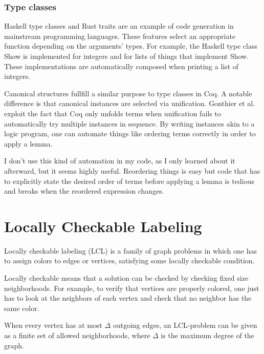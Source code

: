 \documentclass[english, 12pt, a4paper, sci, a-1b, online]{aaltothesis}
\begin{document}
\subsubsection{Type classes}

Haskell type classes and Rust traits are an example of code generation in mainstream programming languages. These features select an appropriate function depending on the arguments' types. For example, the Haskell type class Show is implemented for integers and for lists of things that implement Show. These implementations are automatically composed when printing a list of integers.

Canonical structures fullfill a similar purpose to type classes in Coq. A notable difference is that canonical instances are selected via unification. Gonthier et al.~\cite{overloadingCanonical} exploit the fact that Coq only unfolds terms when unification fails to automatically try multiple instances in sequence. By writing instances akin to a logic program, one can automate things like ordering terms correctly in order to apply a lemma.

I don't use this kind of automation in my code, as I only learned about it afterward, but it seems highly useful. Reordering things is easy but code that has to explicitly state the desired order of terms before applying a lemma is tedious and breaks when the reordered expression changes.

\clearpage %

\section{Locally Checkable Labeling}\label{lclsection}

Locally checkable labeling (LCL) is a family of graph problems in which one has to assign colors to edges or vertices, satisfying some locally checkable condition.~\cite{LCL}

Locally checkable means that a solution can be checked by checking fixed size neighborhoods. For example, to verify that vertices are properly colored, one just has to look at the neighbors of each vertex and check that no neighbor has the same color.

When every vertex has at most $\Delta$ outgoing edges, an LCL-problem can be given as a finite set of allowed neighborhoods, where $\Delta$ is the maximum degree of the graph.

\newcommand\tick{\fill[scale=0.6, color=black!40!green](0,.35) -- (.25,0) -- (1,.7) -- (.25,.15) -- cycle;}
\newcommand\cross{\draw[scale=0.3, very thick, color=red] (0,0) -- (1, 1) {} (0, 1) -- (1, 0) {};}
\end{document}
